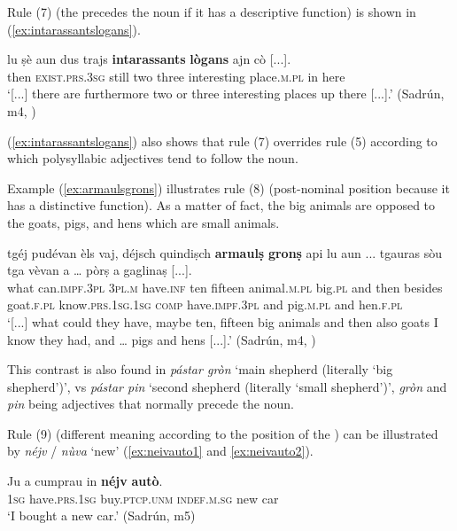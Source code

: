 Rule (7) (the  precedes the noun if it has a descriptive function) is shown in (\ref{ex:intarassantslogans}).

\ea
\label{ex:intarassantslogans}
\gll [...] lu ṣè aun dus trajs \textbf{intarassants} \textbf{lògans} ajn cò [...].\\
 {} then \textsc{exist.prs.3sg} still two three interesting place.\textsc{m.pl} in here\\
\glt `[...] there are furthermore two or three interesting places up there [...].' (Sadrún, m4, )
\z

(\ref{ex:intarassantslogans}) also shows that rule (7) overrides rule (5) according to which polysyllabic adjectives tend to follow the noun.

Example (\ref{ex:armaulsgrons}) illustrates rule (8) (post-nominal position because it has a distinctive function). As a matter of fact, the big animals are opposed to the goats, pigs, and hens which are small animals.

\ea
\label{ex:armaulsgrons}
\gll   [...] tgéj pudévan èls vaj, déjsch quindiṣch \textbf{armaulṣ} \textbf{gronṣ} api lu aun ... tgauras sòu tga vèvan a … pòrṣ a gaglinaṣ [...]. \\
{} what can.\textsc{impf.3pl} \textsc{3pl.m} have.\textsc{inf} ten fifteen animal.\textsc{m.pl} big.\textsc{pl} and then besides {} goat.\textsc{f.pl} know.\textsc{prs.1sg.1sg} \textsc{comp} have.\textsc{impf.3pl} and {} pig.\textsc{m.pl} and hen.\textsc{f.pl}\\
\glt `[...] what could they have, maybe ten, fifteen big animals and then also goats I know they had, and … pigs and hens [...].' (Sadrún, m4, )
\z

This contrast is also found in \textit{pástar gròn} `main shepherd (literally `big shepherd')', vs \textit{pástar pin} `second shepherd (literally `small shepherd')', \textit{gròn} and \textit{pin} being adjectives that normally precede the noun.


Rule (9) (different meaning according to the position of the ) can be illustrated by \textit{néjv} / \textit{nùva} `new' (\ref{ex:neivauto1} and \ref{ex:neivauto2}).

\ea
\label{ex:neivauto1}
\gll Ju a cumprau in \textbf{néjv} \textbf{autò}.\\
\textsc{1sg} have.\textsc{prs.1sg} buy.\textsc{ptcp.unm} \textsc{indef.m.sg} new car\\
\glt `I bought a new car.' (Sadrún, m5)
\z

